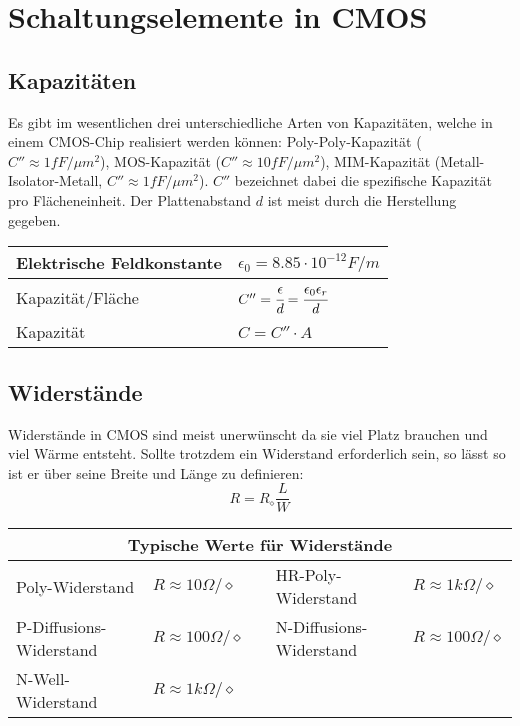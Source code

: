 \section{Schaltungselemente in CMOS}

\subsection{Kapazitäten}
Es gibt im wesentlichen drei unterschiedliche Arten von Kapazitäten, welche in einem CMOS-Chip realisiert werden können: 
Poly-Poly-Kapazität ($C'' \approx 1fF/\mu m^2$),
MOS-Kapazität ($C'' \approx 10fF/\mu m^2$),
MIM-Kapazität (Metall-Isolator-Metall, $C'' \approx 1fF/\mu m^2$). $C''$ bezeichnet dabei die spezifische Kapazität pro Flächeneinheit.
Der Plattenabstand $d$ ist meist durch die Herstellung gegeben.

\begin{tabularx}{\linewidth}{|l|X|}
	\hline
	Elektrische Feldkonstante	& $\epsilon_0 = 8.85 \cdot 10^{-12} F/m$
	\\ \hline
	Kapazität/Fläche	& $C'' = \cfrac{\epsilon}{d} = \cfrac{\epsilon_0 \epsilon_r}{d}$
	\\ \hline
	Kapazität & $C = C'' \cdot A$
	\\ \hline
\end{tabularx}

\subsection{Widerstände}
Widerstände in CMOS sind meist unerwünscht da sie viel Platz brauchen und viel Wärme entsteht. Sollte trotzdem ein
Widerstand erforderlich sein, so lässt so ist er über seine Breite und Länge zu definieren:
\[
	R = R_\diamond \frac{L}{W}
\]

\begin{tabularx}{0.8\linewidth}{|l|l|X|l|l|}
	\hline
	\multicolumn{5}{|c|}{\textbf{Typische Werte für Widerstände}}
	\\ \hline
	Poly-Widerstand & $R \approx 10 \Omega/\diamond$ & & HR-Poly-Widerstand & $R \approx 1k\Omega/\diamond$
	\\ \hline
	P-Diffusions-Widerstand & $R \approx 100\Omega/\diamond$ & & N-Diffusions-Widerstand & $R \approx 100\Omega/\diamond$
	\\ \hline
	N-Well-Widerstand & $R \approx 1k\Omega/\diamond$ & & &
	\\ \hline
\end{tabularx}